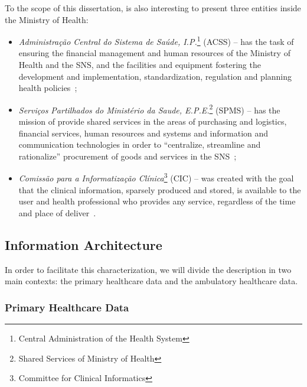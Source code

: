 To the scope of this dissertation, is also interesting to present three entities inside the Ministry of Health:
\begin{itemize}
\item \textit{Administração Central do Sistema de Saúde, I.P.}\footnote{Central Administration of the Health System} (ACSS) -- has the task of ensuring the financial management and human resources of the Ministry of Health and the SNS, and the facilities and equipment fostering the development and implementation, standardization, regulation and planning health policies~\citep{SAUDE2011};
\item \textit{Serviços Partilhados do Ministério da Saude, E.P.E.}\footnote{Shared Services of Ministry of Health} (SPMS) -- has the mission of provide shared services in the areas of purchasing and logistics, financial services, human resources and systems and information and communication technologies in order to ``centralize, streamline and rationalize'' procurement of goods and services in the SNS~\citep{Saude2010a};
\item \textit{Comissão para a Informatização Clínica}\footnote{Committee for Clinical Informatics} (CIC) -- was created with the goal that the clinical information, sparsely produced and stored, is available to the user and health professional who provides any service, regardless of the time and place of deliver~\citep{Saude2011a}.
\end{itemize}







\subsection{Information Architecture}

In order to facilitate this characterization, we will divide the description in two main contexts: the primary healthcare data and the ambulatory healthcare data.

\subsubsection{Primary Healthcare Data}

